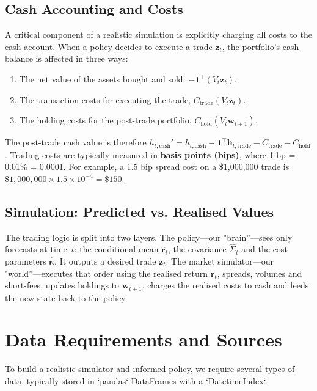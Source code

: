 \documentclass[11pt, letterpaper]{article}
\newcommand{\vect}[1]{\boldsymbol{#1}}
\begin{document}
\subsection{Cash Accounting and Costs}
A critical component of a realistic simulation is explicitly charging all costs to the cash account. When a policy decides to execute a trade $\vect{z}_t$, the portfolio's cash balance is affected in three ways:
\begin{enumerate}
    \item The net value of the assets bought and sold: $-\mathbf{1}^\top (V_t \vect{z}_t)$.
    \item The transaction costs for executing the trade, $C_{\text{trade}}(V_t \vect{z}_t)$.
    \item The holding costs for the post-trade portfolio, $C_{\text{hold}}(V_t \vect{w}_{t+1})$.
\end{enumerate}
The post-trade cash value is therefore $h_{t, \text{cash}}' = h_{t, \text{cash}} - \mathbf{1}^\top \vect{h}_{t,\text{trade}} - C_{\text{trade}} - C_{\text{hold}}$. Trading costs are typically measured in \textbf{basis points (bips)}, where 1 bp = 0.01\% = 0.0001. For example, a 1.5 bip spread cost on a \$1,000,000 trade is $\$1,000,000 \times 1.5 \times 10^{-4} = \$150$.

\subsection{Simulation: Predicted vs. Realised Values}
The trading logic is split into two layers.  The policy—our "brain''—sees only
forecasts at time~$t$: the conditional mean $\hat{\vect{r}}_t$, the covariance
$\hat{\Sigma}_t$ and the cost parameters $\hat{\vect{\kappa}}$.  It outputs a
desired trade $\vect{z}_t$.  The market simulator—our "world''—executes that
order using the realised return $\vect{r}_t$, spreads, volumes and short-fees,
updates holdings to $\vect{w}_{t+1}$, charges the realised costs to cash and
feeds the new state back to the policy.

\section{Data Requirements and Sources}
To build a realistic simulator and informed policy, we require several types of data, typically stored in `pandas` DataFrames with a `DatetimeIndex`.
\end{document}
